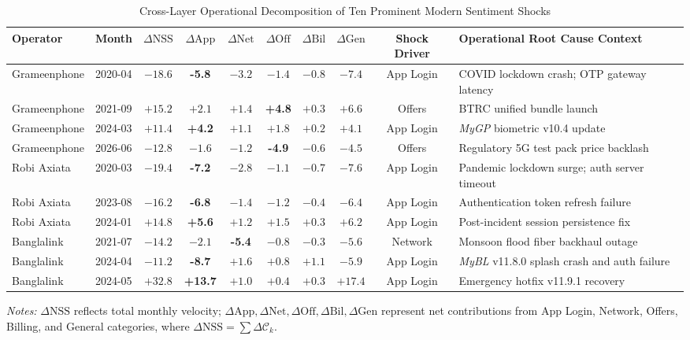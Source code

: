 \documentclass[review,12pt,authoryear]{elsarticle}
\begin{document}
\begin{table}[t]
\centering
\caption{Cross-Layer Operational Decomposition of Ten Prominent Modern Sentiment Shocks}
\label{tab:shocks}
\footnotesize
\setlength{\tabcolsep}{4pt}
\begin{tabularx}{\textwidth}{@{}llcccccccX@{}}
\toprule
Operator & Month & $\Delta\text{NSS}$ & $\Delta\text{App}$ & $\Delta\text{Net}$ & $\Delta\text{Off}$ & $\Delta\text{Bil}$ & $\Delta\text{Gen}$ & Shock Driver & Operational Root Cause Context \\
\midrule
Grameenphone & 2020-04 & $-18.6$ & \textbf{-5.8} & $-3.2$ & $-1.4$ & $-0.8$ & $-7.4$ & App Login & COVID lockdown crash; OTP gateway latency \\
Grameenphone & 2021-09 & $+15.2$ & $+2.1$ & $+1.4$ & \textbf{+4.8} & $+0.3$ & $+6.6$ & Offers & BTRC unified bundle launch \\
Grameenphone & 2024-03 & $+11.4$ & \textbf{+4.2} & $+1.1$ & $+1.8$ & $+0.2$ & $+4.1$ & App Login & \textit{MyGP} biometric v10.4 update \\
Grameenphone & 2026-06 & $-12.8$ & $-1.6$ & $-1.2$ & \textbf{-4.9} & $-0.6$ & $-4.5$ & Offers & Regulatory 5G test pack price backlash \\
\addlinespace
Robi Axiata & 2020-03 & $-19.4$ & \textbf{-7.2} & $-2.8$ & $-1.1$ & $-0.7$ & $-7.6$ & App Login & Pandemic lockdown surge; auth server timeout \\
Robi Axiata & 2023-08 & $-16.2$ & \textbf{-6.8} & $-1.4$ & $-1.2$ & $-0.4$ & $-6.4$ & App Login & Authentication token refresh failure \\
Robi Axiata & 2024-01 & $+14.8$ & \textbf{+5.6} & $+1.2$ & $+1.5$ & $+0.3$ & $+6.2$ & App Login & Post-incident session persistence fix \\
\addlinespace
Banglalink & 2021-07 & $-14.2$ & $-2.1$ & \textbf{-5.4} & $-0.8$ & $-0.3$ & $-5.6$ & Network & Monsoon flood fiber backhaul outage \\
Banglalink & 2024-04 & $-11.2$ & \textbf{-8.7} & $+1.6$ & $+0.8$ & $+1.1$ & $-5.9$ & App Login & \textit{MyBL} v11.8.0 splash crash and auth failure \\
Banglalink & 2024-05 & $+32.8$ & \textbf{+13.7} & $+1.0$ & $+0.4$ & $+0.3$ & $+17.4$ & App Login & Emergency hotfix v11.9.1 recovery \\
\bottomrule
\end{tabularx}
\vspace{0.4em}
\parbox{\textwidth}{\footnotesize \textit{Notes:} $\Delta\text{NSS}$ reflects total monthly velocity; $\Delta\text{App}, \Delta\text{Net}, \Delta\text{Off}, \Delta\text{Bil}, \Delta\text{Gen}$ represent net contributions from App Login, Network, Offers, Billing, and General categories, where $\Delta\text{NSS} = \sum \Delta \mathcal{C}_k$.}
\end{table}
\end{document}
